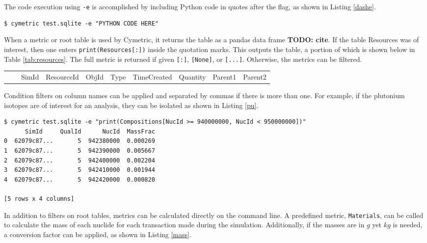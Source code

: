 \documentclass{anstrans}
\newcommand{\cyclus}{\textsc{Cyclus}\xspace}
\newcommand{\TODO}[1] {{\color{red}\textbf{TODO: #1}}}
\newcommand{\code}[1]{{\color{code}\texttt{#1}}}
\begin{document}
The code execution using \code{-e} is accomplished by including Python code in quotes after the flag, as shown in Listing \ref{dashe}. 
\begin{lstlisting}[caption ={Executing Code on a Database}, label=dashe]
$ cymetric test.sqlite -e "PYTHON CODE HERE"
\end{lstlisting}

When a metric or root table is used by Cymetric, it returns the table as a pandas data frame \TODO{cite}. If the table Resources was of interest, then one enters \code{print(Resources[:])} inside the quotation marks. This outputs the table, a portion of which is shown below in Table \ref{tab:resources}. The full metric is returned if given \code{[:]}, \code{[None]}, or \code{[...]}. Otherwise, the metrics can be filtered.

\begin{table*}[htb]
  \centering
\begin{tabular}{llllllllll}
      &       & SimId      & ResourceId      &
      ObjId      & Type      & TimeCreated      & Quantity      &
      Parent1      & Parent2
\\
\end{tabular}
  \caption{The Resources table in the \cyclus database.}
  \label{tab:resources}
\end{table*}

Condition filters on column names can be applied and separated by commas if there is more than one. For example, if the plutonium isotopes are of interest for an analysis, they can be isolated as shown in Listing \ref{pu}. 

\begin{lstlisting}[caption ={Filtering a Root Table in a Database}, label=pu]
 $ cymetric test.sqlite -e "print(Compositions[NucId >= 940000000, NucId < 950000000])"
      SimId     QualId      NucId  MassFrac
0  62079c87...       5  942380000  0.000269
1  62079c87...       5  942390000  0.005667
2  62079c87...       5  942400000  0.002204
3  62079c87...       5  942410000  0.001944
4  62079c87...       5  942420000  0.000820

[5 rows x 4 columns]
\end{lstlisting}

In addition to filters on root tables, metrics can  be calculated directly on the command line. A predefined metric, \code{Materials}, can be called to calculate the mass of each nuclide for each transaction made during the simulation. Additionally, if the masses are in $g$ yet $kg$ is needed, a conversion factor can be applied, as shown in Listing \ref{mass}.
\end{document}
